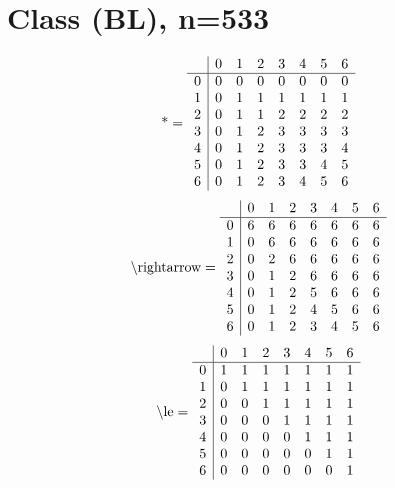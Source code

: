 \documentclass[11pt]{article}
\begin{document}
\section{Class (BL), n=533}
\[\text{*} = 
\begin{array}{r | r r r r r r r}
 & 0 & 1 & 2 & 3 & 4 & 5 & 6 \\ \hline
0 & 0 & 0 & 0 & 0 & 0 & 0 & 0 \\
1 & 0 & 1 & 1 & 1 & 1 & 1 & 1 \\
2 & 0 & 1 & 1 & 2 & 2 & 2 & 2 \\
3 & 0 & 1 & 2 & 3 & 3 & 3 & 3 \\
4 & 0 & 1 & 2 & 3 & 3 & 3 & 4 \\
5 & 0 & 1 & 2 & 3 & 3 & 4 & 5 \\
6 & 0 & 1 & 2 & 3 & 4 & 5 & 6 \\
\end{array}
\]
\[\text{\textbackslash rightarrow} = 
\begin{array}{r | r r r r r r r}
 & 0 & 1 & 2 & 3 & 4 & 5 & 6 \\ \hline
0 & 6 & 6 & 6 & 6 & 6 & 6 & 6 \\
1 & 0 & 6 & 6 & 6 & 6 & 6 & 6 \\
2 & 0 & 2 & 6 & 6 & 6 & 6 & 6 \\
3 & 0 & 1 & 2 & 6 & 6 & 6 & 6 \\
4 & 0 & 1 & 2 & 5 & 6 & 6 & 6 \\
5 & 0 & 1 & 2 & 4 & 5 & 6 & 6 \\
6 & 0 & 1 & 2 & 3 & 4 & 5 & 6 \\
\end{array}
\]
\[\text{\textbackslash le} = 
\begin{array}{r | r r r r r r r}
 & 0 & 1 & 2 & 3 & 4 & 5 & 6 \\ \hline
0 & 1 & 1 & 1 & 1 & 1 & 1 & 1 \\
1 & 0 & 1 & 1 & 1 & 1 & 1 & 1 \\
2 & 0 & 0 & 1 & 1 & 1 & 1 & 1 \\
3 & 0 & 0 & 0 & 1 & 1 & 1 & 1 \\
4 & 0 & 0 & 0 & 0 & 1 & 1 & 1 \\
5 & 0 & 0 & 0 & 0 & 0 & 1 & 1 \\
6 & 0 & 0 & 0 & 0 & 0 & 0 & 1 \\
\end{array}
\]
\end{document}
